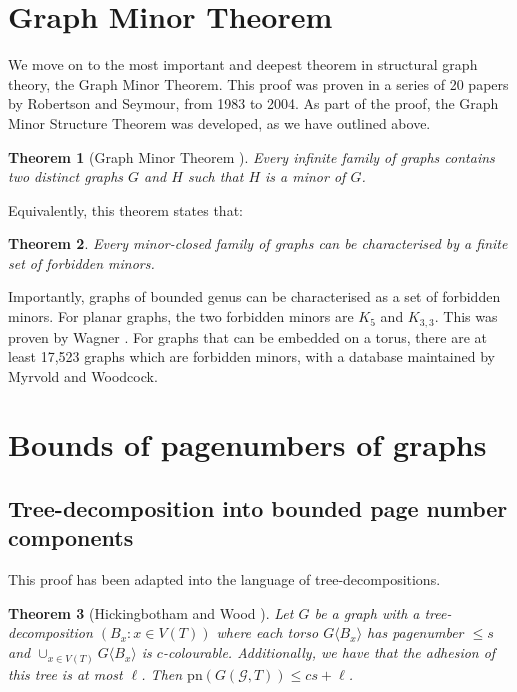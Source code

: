 \documentclass[]{report}
\newcommand{\pn}{\text{pn}}
\newtheorem{theorem}{Theorem}
\theoremstyle{definition}
\numberwithin{theorem}{section}
\numberwithin{equation}{section}
\begin{document}
\section{Graph Minor Theorem}\label{sec:Graph Minor Theorem}
We move on to the most important and deepest theorem in structural graph theory, the Graph Minor Theorem. This proof was proven in a series of 20 papers by Robertson and Seymour, from 1983 to 2004. As part of the proof, the Graph Minor Structure Theorem was developed, as we have outlined above. 
\begin{theorem}[Graph Minor Theorem \cite{robertsonGraphMinorsXX2004}]
	Every infinite family of graphs contains two distinct graphs $G$ and $H$ such that $H$ is a minor of $G$.
\end{theorem}
Equivalently, this theorem states that:
\begin{theorem}
	Every minor-closed family of graphs can be characterised by a finite set of forbidden minors.
\end{theorem}
Importantly, graphs of bounded genus can be characterised as a set of forbidden minors.
For planar graphs, the two forbidden minors are $K_5$ and $K_{3,3}$. This was proven by Wagner \cite{wagnerUeberEigenschaftEbenen1937}. 
For graphs that can be embedded on a torus, there are at least 17,523 graphs which are forbidden minors, with a database maintained by Myrvold and Woodcock\cite{myrvoldLargeSetTorus2018}. 

\section{Bounds of pagenumbers of graphs}\label{sec:BoundedPagenumber} 
\subsection{Tree-decomposition into bounded page number components}\label{ssec:Clique_sum_Pagenumber_bound}

This proof has been adapted into the language of tree-decompositions. 
\begin{theorem}[Hickingbotham and Wood \cite{hickingbothamStackNumberCliqueSum2023}]\label{thm:clique_sum_pagenumber_bound}
	Let $G$ be a graph with a tree-decomposition $(B_x: x \in V(T))$ where each torso $G \langle B_x \rangle$ has pagenumber $\leq s$ and $\cup_{x \in V(T)} G \langle B_x \rangle$ is $c$-colourable. Additionally, we have that the adhesion of this tree is at most $\ell$.
	 Then $\pn(G(\mathcal{G}, T)) \leq cs + \ell$.  
\end{theorem}
\end{document}
